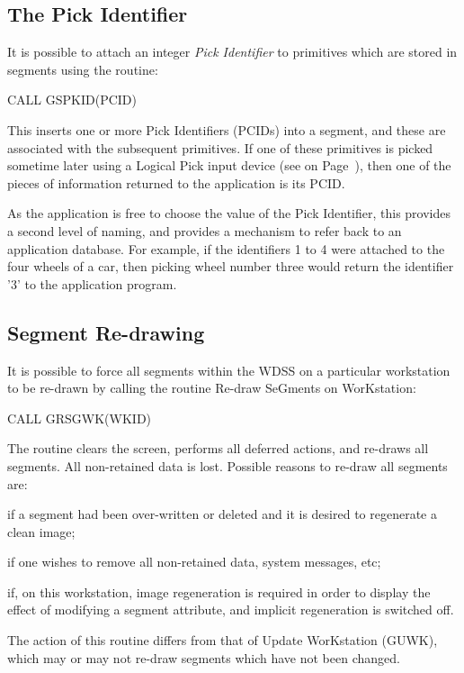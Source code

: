 \subsection{The Pick Identifier}
 
It is possible to attach an integer {\it Pick Identifier} to primitives
which are stored in segments using the routine:
\begin{XMP}
CALL GSPKID(PCID)
\end{XMP}
This inserts one or more Pick Identifiers (PCIDs) into a
segment, and these are associated with the subsequent primitives.
If one of these primitives is picked sometime later using a Logical Pick
input device (see on Page~\pageref{sec:inphdr}), then one of the
pieces of information returned to the application is its PCID.
 
As the application is free to choose the value of the Pick Identifier,
this provides a second level of naming,
and provides a mechanism to refer back to an application database.
For example, if the identifiers 1 to 4 were attached to the four wheels
of a car, then picking wheel number three would return the identifier
'3' to the application program.
\subsection{\protect\label{sec:grsgwk}Segment Re-drawing}
 
It is possible to force all segments within the WDSS on a particular
workstation to be re-drawn by calling the routine
Re-draw SeGments on WorKstation:
\begin{XMP}
CALL GRSGWK(WKID)
\end{XMP}
 
The routine clears the screen, performs all deferred actions,
and re-draws all segments. All non-retained data is lost.
Possible reasons to re-draw all segments are:
\begin{OL}
\item if a segment had been over-written or deleted and it is
desired to regenerate a clean image;
\item if one wishes to remove all non-retained data,
system messages, etc;
\item if, on this workstation, image regeneration is required in order to
display the effect of modifying a segment attribute, and implicit
regeneration is switched off.
\end{OL}
The action of this routine differs from that of
Update WorKstation (GUWK), which may or may not re-draw segments
which have not been changed.

